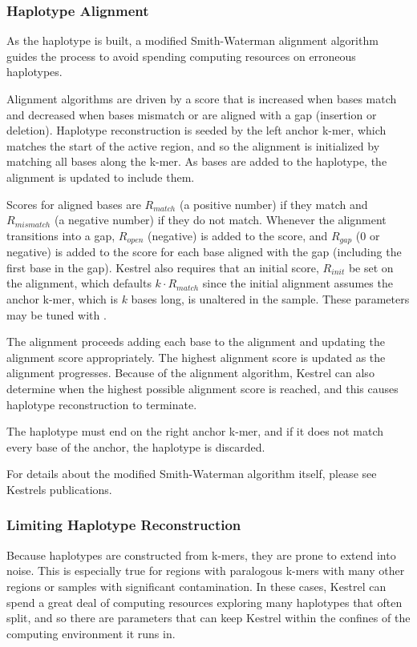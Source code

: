 \subsubsection{Haplotype Alignment}
\label{sec.process.haplo.align}

As the haplotype is built, a modified Smith-Waterman alignment algorithm guides the process to avoid spending computing resources on erroneous haplotypes.

Alignment algorithms are driven by a score that is increased when bases match and decreased when bases mismatch or are aligned with a gap (insertion or deletion). Haplotype reconstruction is seeded by the left anchor k-mer, which matches the start of the active region, and so the alignment is initialized by matching all bases along the k-mer. As bases are added to the haplotype, the alignment is updated to include them.

Scores for aligned bases are $R_{match}$ (a positive number) if they match and $R_{mismatch}$ (a negative number) if they do not match. Whenever the alignment transitions into a gap, $R_{open}$ (negative) is added to the score, and $R_{gap}$ ($0$ or negative) is added to the score for each base aligned with the gap (including the first base in the gap). Kestrel also requires that an initial score, $R_{init}$ be set on the alignment, which defaults $k \cdot R_{match}$ since the initial alignment assumes the anchor k-mer, which is $k$ bases long, is unaltered in the sample. These parameters may be tuned with .

The alignment proceeds adding each base to the alignment and updating the alignment score appropriately. The highest alignment score is updated as the alignment progresses. Because of the alignment algorithm, Kestrel can also determine when the highest possible alignment score is reached, and this causes haplotype reconstruction to terminate.

The haplotype must end on the right anchor k-mer, and if it does not match every base of the anchor, the haplotype is discarded.

For details about the modified Smith-Waterman algorithm itself, please see Kestrels publications.


\subsubsection{Limiting Haplotype Reconstruction}
\label{sec.process.haplo.limits}

Because haplotypes are constructed from k-mers, they are prone to extend into noise. This is especially true for regions with paralogous k-mers with many other regions or samples with significant contamination. In these cases, Kestrel can spend a great deal of computing resources exploring many haplotypes that often split, and so there are parameters that can keep Kestrel within the confines of the computing environment it runs in.

